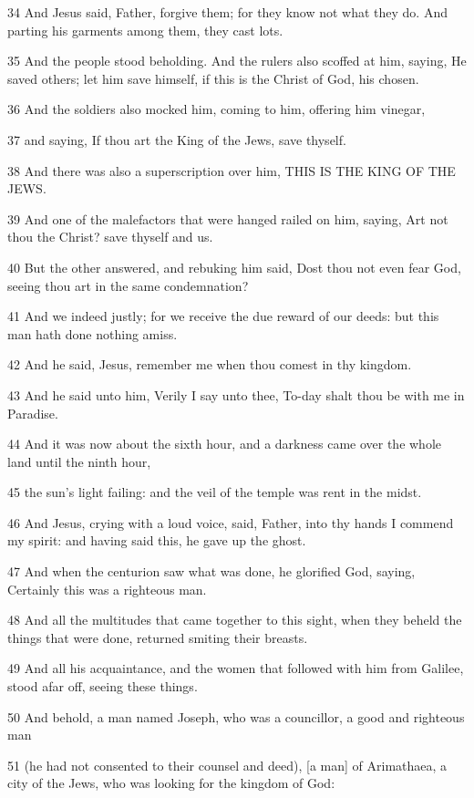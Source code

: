 \par 34 And Jesus said, Father, forgive them; for they know not what they do. And parting his garments among them, they cast lots.
\par 35 And the people stood beholding. And the rulers also scoffed at him, saying, He saved others; let him save himself, if this is the Christ of God, his chosen.
\par 36 And the soldiers also mocked him, coming to him, offering him vinegar,
\par 37 and saying, If thou art the King of the Jews, save thyself.
\par 38 And there was also a superscription over him, THIS IS THE KING OF THE JEWS.
\par 39 And one of the malefactors that were hanged railed on him, saying, Art not thou the Christ? save thyself and us.
\par 40 But the other answered, and rebuking him said, Dost thou not even fear God, seeing thou art in the same condemnation?
\par 41 And we indeed justly; for we receive the due reward of our deeds: but this man hath done nothing amiss.
\par 42 And he said, Jesus, remember me when thou comest in thy kingdom.
\par 43 And he said unto him, Verily I say unto thee, To-day shalt thou be with me in Paradise.
\par 44 And it was now about the sixth hour, and a darkness came over the whole land until the ninth hour,
\par 45 the sun's light failing: and the veil of the temple was rent in the midst.
\par 46 And Jesus, crying with a loud voice, said, Father, into thy hands I commend my spirit: and having said this, he gave up the ghost.
\par 47 And when the centurion saw what was done, he glorified God, saying, Certainly this was a righteous man.
\par 48 And all the multitudes that came together to this sight, when they beheld the things that were done, returned smiting their breasts.
\par 49 And all his acquaintance, and the women that followed with him from Galilee, stood afar off, seeing these things.
\par 50 And behold, a man named Joseph, who was a councillor, a good and righteous man
\par 51 (he had not consented to their counsel and deed), [a man] of Arimathaea, a city of the Jews, who was looking for the kingdom of God:
